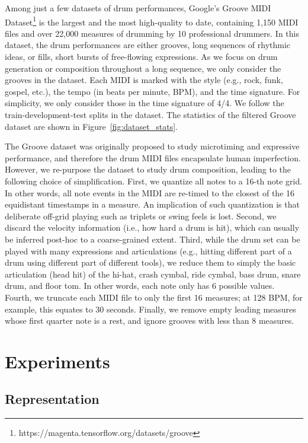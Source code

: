 \documentclass[letterpaper]{article} %
\begin{document}
Among just a few datasets of drum performances, Google's Groove MIDI Dataset\footnote{https://magenta.tensorflow.org/datasets/groove} is the largest and the most high-quality to date, containing 1,150 MIDI files and over 22,000 measures of drumming by 10 professional drummers. In this dataset, the drum performances are either grooves, long sequences of rhythmic ideas, or fills, short bursts of free-flowing expressions. As we focus on drum generation or composition throughout a long sequence, we only consider the grooves in the dataset. Each MIDI is marked with the style (e.g., rock, funk, gospel, etc.), the tempo (in beats per minute, BPM), and the time signature. For simplicity, we only consider those in the time signature of 4/4. We follow the train-development-test splits in the dataset. The statistics of the filtered Groove dataset are shown in Figure~\ref{fig:dataset_stats}. 

The Groove dataset was originally proposed to study microtiming and expressive performance, and therefore the drum MIDI files encapsulate human imperfection. However, we re-purpose the dataset to study drum composition, leading to the following choice of simplification. First, we quantize all notes to a 16-th note grid. In other words, all note events in the MIDI are re-timed to the closest of the 16 equidistant timestamps in a measure. An implication of such quantization is that deliberate off-grid playing such as triplets or swing feels is lost. Second, we discard the velocity information (i.e., how hard a drum is hit), which can usually be inferred post-hoc to a coarse-grained extent. Third, while the drum set can be played with many expressions and articulations (e.g., hitting different part of a drum using different part of different tools), we reduce them to simply the basic articulation (head hit) of the hi-hat, crash cymbal, ride cymbal, bass drum, snare drum, and floor tom. In other words, each note only has 6 possible values. Fourth, we truncate each MIDI file to only the first 16 measures; at 128 BPM, for example, this equates to 30 seconds. Finally, we remove empty leading measures whose first quarter note is a rest, and ignore grooves with less than 8 measures.

\section{Experiments}

\subsection{Representation}
\end{document}

